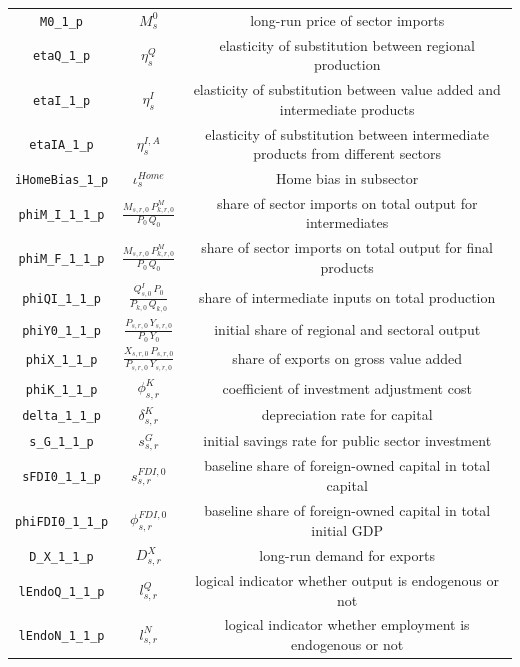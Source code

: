 \begin{center}
\begin{longtable}{ccc}
\texttt{M0\_1\_p} & ${M^{0}_{s}}$ & long-run price of sector imports\\
\texttt{etaQ\_1\_p} & ${\eta^{Q}_{s}}$ & elasticity of substitution between regional production\\
\texttt{etaI\_1\_p} & ${\eta^{I}_{s}}$ & elasticity of substitution between value added and intermediate products\\
\texttt{etaIA\_1\_p} & ${\eta^{I,A}_{s}}$ & elasticity of substitution between intermediate products from different sectors\\
\texttt{iHomeBias\_1\_p} & ${\iota^{Home}_{s}}$ & Home bias in subsector\\
\texttt{phiM\_I\_1\_1\_p} & $\frac{M_{s,r,0} \, P^{M}_{k,r,0}}{P_{0} \, Q_{0}}$ & share of sector imports on total output for intermediates\\
\texttt{phiM\_F\_1\_1\_p} & $\frac{M_{s,r,0} \, P^{M}_{k,r,0}}{P_{0} \, Q_{0}}$ & share of sector imports on total output for final products\\
\texttt{phiQI\_1\_1\_p} & $\frac{Q^{I}_{s,0} \, P_{0}}{P_{k,0} \, Q_{k,0}}$ & share of intermediate inputs on total production\\
\texttt{phiY0\_1\_1\_p} & $\frac{P_{s,r,0} \, Y_{s,r,0}}{P_{0} \, Y_{0}}$ & initial share of regional and sectoral output\\
\texttt{phiX\_1\_1\_p} & $\frac{X_{s,r,0} \, P_{s,r,0}}{P_{s,r,0} \, Y_{s,r,0}}$ & share of exports on gross value added\\
\texttt{phiK\_1\_1\_p} & ${\phi^{K}_{s,r}}$ & coefficient of investment adjustment cost\\
\texttt{delta\_1\_1\_p} & ${\delta^{K}_{s,r}}$ & depreciation rate for capital\\
\texttt{s\_G\_1\_1\_p} & ${s^{G}_{s,r}}$ & initial savings rate for public sector investment\\
\texttt{sFDI0\_1\_1\_p} & ${s^{FDI,0}_{s,r}}$ & baseline share of foreign-owned capital in total capital\\
\texttt{phiFDI0\_1\_1\_p} & ${\phi^{FDI,0}_{s,r}}$ & baseline share of foreign-owned capital in total initial GDP\\
\texttt{D\_X\_1\_1\_p} & ${D^{X}_{s,r}}$ & long-run demand for exports\\
\texttt{lEndoQ\_1\_1\_p} & ${l^{Q}_{s,r}}$ & logical indicator whether output is endogenous or not\\
\texttt{lEndoN\_1\_1\_p} & ${l^{N}_{s,r}}$ & logical indicator whether employment is endogenous or not\\

\end{longtable}
\end{center}
